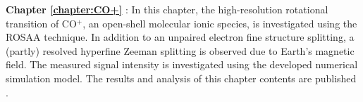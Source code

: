 \textbf{Chapter \ref{chapter:CO+}} \emph{}: In this chapter, the high-resolution rotational transition of CO$^+$, an open-shell molecular ionic species, is investigated using the ROSAA technique. In addition to an unpaired electron fine structure splitting, a (partly) resolved hyperfine Zeeman splitting is observed due to Earth's magnetic field. The measured signal intensity is investigated using the developed numerical simulation model. The results and analysis of this chapter contents are published \cite{marimuthu_zeeman_2022}.\\

